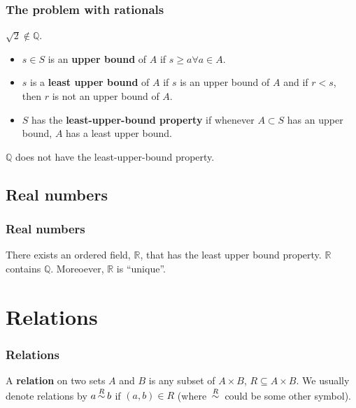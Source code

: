 \documentclass[compress]{beamer}
\def\rel{\,{\buildrel R \over \sim}\,}
\begin{document}
\begin{frame}
  \frametitle{The problem with rationals}
  \begin{theorem}
    $\sqrt{2} \not\in \mathbb{Q}$.
  \end{theorem}
  \begin{itemize}
  \item $s \in S$ is an \textbf{upper bound} of $A$ if $s \geq a \forall
    a \in A$.
  \item $s$ is a \textbf{least upper bound} of $A$ if $s$ is an upper
    bound of $A$ and if $r < s$, then $r$ is not an upper bound of
    $A$. 
  \item $S$ has the \textbf{least-upper-bound property} if whenever $A
    \subset S$ has an upper bound, $A$ has a least upper bound.
  \end{itemize}
  \begin{theorem}
    $\mathbb{Q}$ does not have the least-upper-bound property.
  \end{theorem}
\end{frame}

\subsection{Real numbers}
\begin{frame}
  \frametitle{Real numbers}
  \begin{theorem}
    There exists an ordered field, $\mathbb{R}$, that has the least
    upper bound property. $\mathbb{R}$ contains $\mathbb{Q}$. Moreoever,
    $\mathbb{R}$ is ``unique''.
  \end{theorem}
\end{frame}

\section{Relations}

\begin{frame}\frametitle{Relations}
  \begin{definition}[Relation]
    A \textbf{relation} on two sets $A$ and $B$ is any subset of $A
    \times B$, $R \subseteq A \times B$. We usually denote relations by
    $a \rel b$ if $(a,b) \in R$ (where $\rel$ could be some other symbol).
  \end{definition}
\end{frame}
\end{document}
